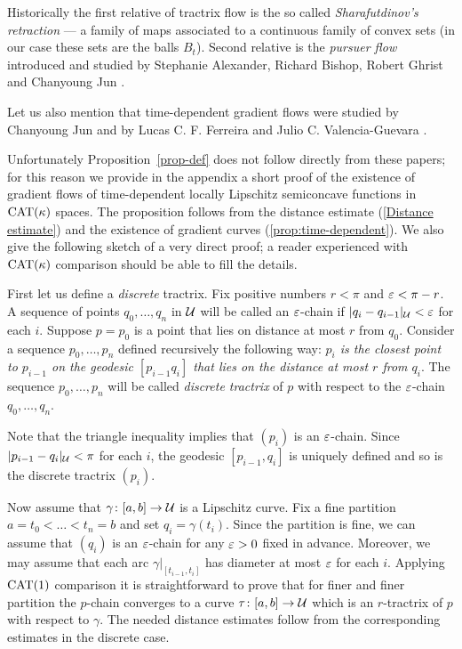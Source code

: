 \documentclass[oneside,a4paper, 12pt]{article}
\begin{document}
Historically the first relative of tractrix flow
is the so called \emph{Sharafutdinov's retraction} \cite{sharafutdinov} --- a family of maps associated to a continuous family of convex sets (in our case these sets are the balls $B_t$). 
Second relative is the \emph{pursuer flow} introduced and studied by Stephanie Alexander, Richard Bishop, Robert Ghrist and Chanyoung Jun \cite{ABG,jun-thesis,jun,jun:grad}.

Let us also mention that time-dependent gradient flows were studied by Chanyoung Jun \cite{jun-thesis,jun:grad} and  by Lucas C. F. Ferreira and Julio C. Valencia-Guevara \cite{ferreira-valencia}.

Unfortunately Proposition~\ref{prop-def} does not follow directly from these papers; for this reason we provide in the appendix a short proof of the existence of
gradient flows of time-dependent locally Lipschitz semiconcave functions in $\mathrm{CAT}(\kappa)$ spaces.
The proposition follows from the distance estimate (\ref{Distance estimate}) and the existence of gradient curves (\ref{prop:time-dependent}).
We also give the following sketch of a very direct proof;
a reader experienced with $\mathrm{CAT}(\kappa)$ comparison should be able to fill the details.

First let us define a \emph{discrete} tractrix.
Fix positive numbers $r<\pi$ and $\varepsilon<\pi-r$. 
A sequence of points $q_0,\dots,q_n$ in  ${\mathcal{U}}$ will be called an $\varepsilon$-chain if $|q_i-q_{i-1}|_{\mathcal{U}}<\varepsilon$ for each $i$.
Suppose $p=p_0$ is a point that lies on distance at most $r$ from  $q_0$.
Consider a sequence $p_0,\dots,p_n$ defined recursively the following way:
\emph{$p_i$ is the closest point to $p_{i-1}$ on the geodesic $[p_{i-1}q_i]$ that lies on the distance at most $r$ from $q_i$}.
The sequence $p_0,\dots,p_n$ will be called \emph{discrete tractrix} of $p$ with respect to the $\varepsilon$-chain $q_0,\dots,q_n$.

Note that the triangle inequality implies that $(p_i)$ is an $\varepsilon$-chain.
Since $|p_{i-1}-q_i|_{\mathcal{U}}<\pi$ for each $i$, the geodesic $[p_{i-1},q_i]$ is uniquely defined and 
so is the discrete tractrix $(p_i)$.

Now assume that $\gamma\colon[a,b]\to \mathcal{U}$ is a Lipschitz curve.
Fix a fine partition $a=t_0<\dots<t_n=b$ and set $q_i=\gamma(t_i)$.
Since the partition is fine, we can assume that $(q_i)$ is an $\varepsilon$-chain for any $\varepsilon>0$ fixed in advance.
Moreover, we may assume that each arc $\gamma|_{[t_{i-1},t_i]}$ has diameter at most $\varepsilon$ for each $i$.
Applying $\mathrm{CAT}(1)$ comparison it is straightforward to prove that for finer and finer partition the $p$-chain converges to a curve $\tau\colon[a,b]\to \mathcal{U}$ which is an $r$-tractrix of $p$ with respect to $\gamma$.
The needed distance estimates follow from the corresponding estimates in the discrete case.
\qeds
\end{document}
